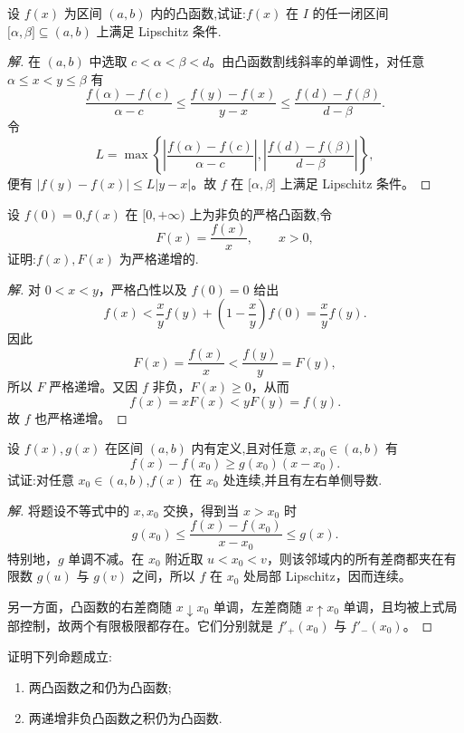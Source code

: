 \documentclass[../../数学分析培优讲义(答案版).tex]{subfiles}
\begin{document}
\begin{example}
设 $f(x)$ 为区间 $(a,b)$ 内的凸函数,试证:$f(x)$ 在 $I$ 的任一闭区间 $\lbrack \alpha,\beta\rbrack\subseteq(a,b)$ 上满足 Lipschitz 条件.
\end{example}

\begin{proof}[解]
在 $(a,b)$ 中选取 $c<\alpha<\beta<d$。由凸函数割线斜率的单调性，对任意 $\alpha\leq x<y\leq\beta$ 有
\[
    \dfrac{f(\alpha)-f(c)}{\alpha-c}
    \leq\dfrac{f(y)-f(x)}{y-x}
    \leq\dfrac{f(d)-f(\beta)}{d-\beta}.
\]
令
\[
    L=\max\left\{
    \left|\dfrac{f(\alpha)-f(c)}{\alpha-c}\right|,
    \left|\dfrac{f(d)-f(\beta)}{d-\beta}\right|
    \right\},
\]
便有 $|f(y)-f(x)|\leq L|y-x|$。故 $f$ 在 $\lbrack\alpha,\beta\rbrack$ 上满足 Lipschitz 条件。
\end{proof}

\begin{example}
设 $f(0)=0$,$f(x)$ 在 $\lbrack 0,+\infty)$ 上为非负的严格凸函数,令
\[
    F(x)=\dfrac{f(x)}{x},\qquad x>0,
\]
证明:$f(x),F(x)$ 为严格递增的.
\end{example}

\begin{proof}[解]
对 $0<x<y$，严格凸性以及 $f(0)=0$ 给出
\[
    f(x)
    <\dfrac{x}{y}f(y)+\left(1-\dfrac{x}{y}\right)f(0)
    =\dfrac{x}{y}f(y).
\]
因此
\[
    F(x)=\dfrac{f(x)}{x}<\dfrac{f(y)}{y}=F(y),
\]
所以 $F$ 严格递增。又因 $f$ 非负，$F(x)\geq0$，从而
\[
    f(x)=xF(x)<yF(y)=f(y).
\]
故 $f$ 也严格递增。
\end{proof}

\begin{example}
设 $f(x),g(x)$ 在区间 $(a,b)$ 内有定义,且对任意 $x,x_0\in(a,b)$ 有
\[
    f(x)-f(x_0)\geq g(x_0)(x-x_0).
\]
试证:对任意 $x_0\in(a,b)$,$f(x)$ 在 $x_0$ 处连续,并且有左右单侧导数.
\end{example}

\begin{proof}[解]
将题设不等式中的 $x,x_0$ 交换，得到当 $x>x_0$ 时
\[
    g(x_0)
    \leq\dfrac{f(x)-f(x_0)}{x-x_0}
    \leq g(x).
\]
特别地，$g$ 单调不减。在 $x_0$ 附近取 $u<x_0<v$，则该邻域内的所有差商都夹在有限数 $g(u)$ 与 $g(v)$ 之间，所以 $f$ 在 $x_0$ 处局部 Lipschitz，因而连续。

另一方面，凸函数的右差商随 $x\downarrow x_0$ 单调，左差商随 $x\uparrow x_0$ 单调，且均被上式局部控制，故两个有限极限都存在。它们分别就是 $f'_+(x_0)$ 与 $f'_-(x_0)$。
\end{proof}

\begin{example}
证明下列命题成立:
\begin{enumerate}[label=(\arabic*)]
    \item 两凸函数之和仍为凸函数;
    \item 两递增非负凸函数之积仍为凸函数.
\end{enumerate}
\end{example}
\end{document}
